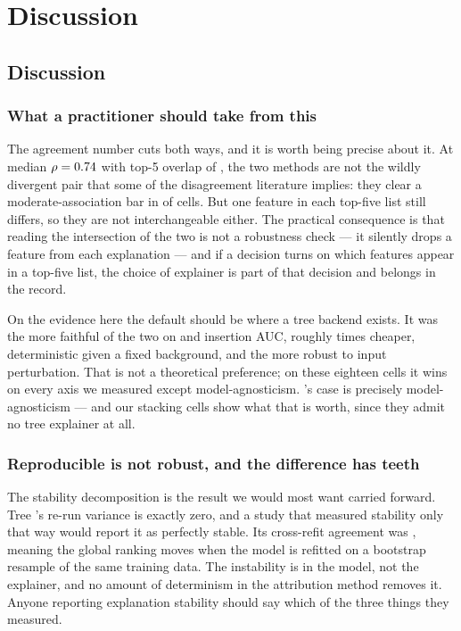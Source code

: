 \chapter{Discussion}\label{ch:discussion}

\section{Discussion}\label{sec:discussion}

\subsection{What a practitioner should take from this}
The agreement number cuts both ways, and it is worth being precise about it. At median
$\rho = 0.74{}$ with top-5 overlap of \MedianJaccardFive{}, the two methods are
not the wildly divergent pair that some of the disagreement literature implies: they
clear a moderate-association bar in \HOneRejected{} of \HOneTotal{} cells. But one
feature in each top-five list still differs, so they are not interchangeable either. The
practical consequence is that reading the intersection of the two is not a robustness
check --- it silently drops a feature from each explanation --- and if a decision turns
on which features appear in a top-five list, the choice of explainer is part of that
decision and belongs in the record.

On the evidence here the default should be \shap{} where a tree backend exists. It was
the more faithful of the two on \aopc{} and insertion AUC, roughly \SpeedFactor{} times
cheaper, deterministic given a fixed background, and the more robust to input
perturbation. That is not a theoretical preference; on these eighteen cells it wins on
every axis we measured except model-agnosticism. \lime{}'s case is precisely
model-agnosticism --- and our stacking cells show what that is worth, since they admit
no tree explainer at all.

\subsection{Reproducible is not robust, and the difference has teeth}
The stability decomposition is the result we would most want carried forward. Tree
\shap{}'s re-run variance is exactly zero, and a study that measured stability only
that way would report it as perfectly stable. Its cross-refit agreement was
\RetrainShap{}, meaning the global ranking moves when the model is refitted on a
bootstrap resample of the same training data. The instability is in the model, not the
explainer, and no amount of determinism in the attribution method removes it. Anyone
reporting explanation stability should say which of the three things they measured.

